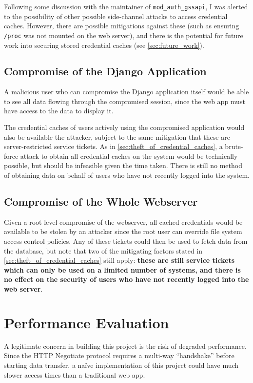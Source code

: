 \documentclass[12pt]{report}
\begin{document}
Following some discussion with the maintainer of \verb+mod_auth_gssapi+, I was alerted to the possibility of other possible side-channel attacks to access credential caches\cite{mod_auth_pr}. However, there are possible mitigations against these (such as ensuring \verb+/proc+ was not mounted on the web server), and there is the potential for future work into securing stored credential caches (see \autoref{sec:future_work}).

\subsection{Compromise of the Django Application}
A malicious user who can compromise the Django application itself would be able to see all data flowing through the compromised session, since the web app must have access to the data to display it.

The credential caches of users actively using the compromised application would also be available the attacker, subject to the same mitigation that these are server-restricted service tickets. As in \autoref{sec:theft_of_credential_caches}, a brute-force attack to obtain all credential caches on the system would be technically possible, but should be infeasible given the time taken. There is still no method of obtaining data on behalf of users who have not recently logged into the system.

\subsection{Compromise of the Whole Webserver}
Given a root-level compromise of the webserver, all cached credentials would be available to be stolen by an attacker since the root user can override file system access control policies. Any of these tickets could then be used to fetch data from the database, but note that two of the mitigating factors stated in \autoref{sec:theft_of_credential_caches} still apply: \textbf{these are still service tickets which can only be used on a limited number of systems, and there is no effect on the security of users who have not recently logged into the web server}.

\section{Performance Evaluation}
\label{sec:performance_evaluation}
A legitimate concern in building this project is the risk of degraded performance. Since the HTTP Negotiate protocol requires a multi-way ``handshake'' before starting data transfer, a na\"ive implementation of this project could have much slower access times than a traditional web app.
\end{document}
